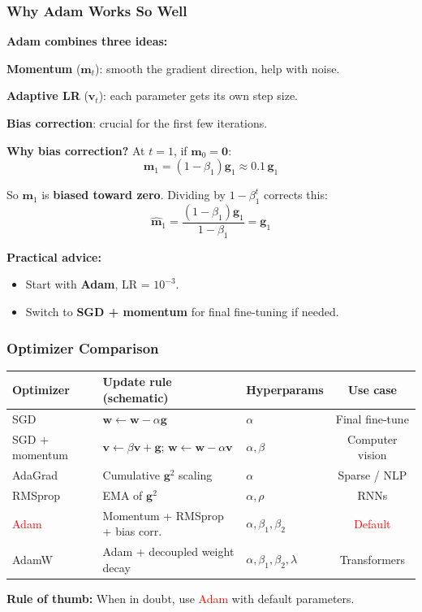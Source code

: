 \documentclass[notes,11pt, aspectratio=169]{beamer}
\newenvironment{wideitemize}{\itemize\addtolength{\itemsep}{10pt}}{\enditemize}
\newcommand{\vw}{\mathbf{w}}
\newcommand{\vg}{\mathbf{g}}
\newcommand{\vm}{\mathbf{m}}
\newcommand{\vv}{\mathbf{v}}
\begin{document}
\begin{frame}
\frametitle{Why Adam Works So Well}

\textbf{Adam combines three ideas:}
\begin{wideitemize}
    \item \textbf{Momentum} ($\vm_t$): smooth the gradient direction, help with noise.
    \item \textbf{Adaptive LR} ($\vv_t$): each parameter gets its own step size.
    \item \textbf{Bias correction}: crucial for the first few iterations.
\end{wideitemize}

\vspace{8pt}
\textbf{Why bias correction?} At $t = 1$, if $\vm_0 = \mathbf{0}$:
\[
    \vm_1 = (1 - \beta_1) \vg_1 \approx 0.1 \, \vg_1
\]

So $\vm_1$ is \textbf{biased toward zero}. Dividing by $1 - \beta_1^t$ corrects this:
\[
    \hat{\vm}_1 = \frac{(1 - \beta_1)\vg_1}{1 - \beta_1} = \vg_1
\]

\vspace{4pt}
\textbf{Practical advice:}
\begin{itemize}
    \item Start with \textbf{Adam}, LR = $10^{-3}$.
    \item Switch to \textbf{SGD + momentum} for final fine-tuning if needed.
\end{itemize}
\end{frame}

\begin{frame}
\frametitle{Optimizer Comparison}

\renewcommand{\arraystretch}{1.3}
\begin{center}
{\small
\begin{tabular}{lp{4.5cm}lc}
\toprule
\textbf{Optimizer} & \textbf{Update rule (schematic)} & \textbf{Hyperparams} & \textbf{Use case} \\
\midrule
SGD & $\vw \leftarrow \vw - \alpha \vg$ & $\alpha$ & Final fine-tune \\
SGD + momentum & $\vv \leftarrow \beta\vv + \vg$; $\vw \leftarrow \vw - \alpha\vv$ & $\alpha, \beta$ & Computer vision \\
AdaGrad & Cumulative $\vg^2$ scaling & $\alpha$ & Sparse / NLP \\
RMSprop & EMA of $\vg^2$ & $\alpha, \rho$ & RNNs \\
\textcolor{red}{Adam} & Momentum + RMSprop + bias corr. & $\alpha, \beta_1, \beta_2$ & \textcolor{red}{Default} \\
AdamW & Adam + decoupled weight decay & $\alpha, \beta_1, \beta_2, \lambda$ & Transformers \\
\bottomrule
\end{tabular}
}
\end{center}

\vspace{10pt}
\textbf{Rule of thumb:} When in doubt, use \textcolor{red}{Adam} with default parameters.
\end{frame}
\end{document}
